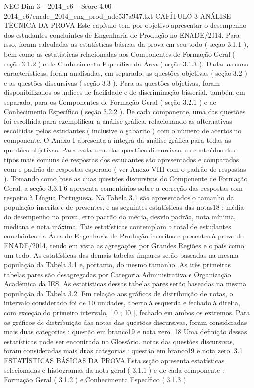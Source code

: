 \begin{textsample}{NEG Dim 3 – 2014\_c6 – Score 4.00 – 2014\_c6/enade\_2014\_eng\_prod\_adc537a947.txt}  \label{ex:f3_neg_247}
CAPÍTULO 3 ANÁLISE TÉCNICA DA PROVA Este capítulo tem por objetivo apresentar o desempenho dos estudantes concluintes de Engenharia de Produção no ENADE/2014.
Para isso, foram calculadas as estatísticas básicas da prova em seu todo ( seção 3.1.1 ), bem como as estatísticas relacionadas aos Componentes de Formação Geral ( seção 3.1.2 ) e de Conhecimento Específico da Área ( seção 3.1.3 ).
Dadas as suas características, foram analisadas, em separado, as questões objetivas ( seção 3.2 ) e as questões discursivas ( seção 3.3 ).
Para as questões objetivas, foram disponibilizados os índices de facilidade e de discriminação bisserial, também em separado, para os Componentes de Formação Geral ( seção 3.2.1 ) e de Conhecimento Específico ( seção 3.2.2 ).
De cada componente, uma das questões foi escolhida para exemplificar a análise gráfica, relacionando as alternativas escolhidas pelos estudantes ( inclusive o gabarito ) com o número de acertos no componente.
O Anexo I apresenta a íntegra da análise gráfica para todas as questões objetivas.
Para cada uma das questões discursivas, os conteúdos dos tipos mais comuns de respostas dos estudantes são apresentados e comparados com o padrão de respostas esperado ( ver Anexo VIII com o padrão de respostas ).
Tomando como base as duas questões discursivas do Componente de Formação Geral, a seção 3.3.1.6 apresenta comentários sobre a correção das respostas com respeito à Língua Portuguesa.
Na Tabela 3.1 são apresentados o tamanho da população inscrita e de presentes, e as seguintes estatísticas das notas18 : média do desempenho na prova, erro padrão da média, desvio padrão, nota mínima, mediana e nota máxima.
Tais estatísticas contemplam o total de estudantes concluintes da Área de Engenharia de Produção inscritos e presentes à prova do ENADE/2014, tendo em vista as agregações por Grandes Regiões e o país como um todo.
As estatísticas das demais tabelas ímpares serão baseadas na mesma população da Tabela 3.1 e, portanto, do mesmo tamanho.
As três primeiras tabelas pares são desagregadas por Categoria Administrativa e Organização Acadêmica da IES.
As estatísticas dessas tabelas pares serão baseadas na mesma população da Tabela 3.2.
Em relação aos gráficos de distribuição de notas, o intervalo considerado foi de 10 unidades, aberto à esquerda e fechado à direita, com exceção do primeiro intervalo, [ 0 ; 10 ], fechado em ambos os extremos.
Para os gráficos de distribuição das notas das questões discursivas, foram consideradas mais duas categorias : questão em branco19 e nota zero. 18 Uma definição dessas estatísticas pode ser encontrada no Glossário. notas das questões discursivas, foram consideradas mais duas categorias : questão em branco19 e nota zero. 3.1 ESTATÍSTICAS BÁSICAS DA PROVA Esta seção apresenta estatísticas selecionadas e histogramas da nota geral ( 3.1.1 ) e de cada componente : Formação Geral ( 3.1.2 ) e Conhecimento Específico ( 3.1.3 ).

\end{textsample}

